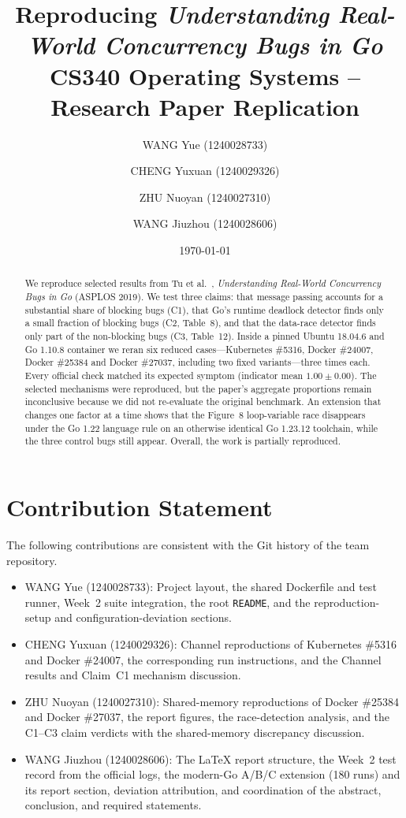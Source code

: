 \documentclass[11pt,a4paper]{article}
\title{Reproducing \emph{Understanding Real-World Concurrency Bugs in Go}\\
\large CS340 Operating Systems -- Research Paper Replication}
\author{
  WANG Yue (1240028733) \and
  CHENG Yuxuan (1240029326) \and
  ZHU Nuoyan (1240027310) \and
  WANG Jiuzhou (1240028606)
}
\date{\today}
\begin{document}
\maketitle

\begin{abstract}
We reproduce selected results from Tu et al.~\cite{tu2019go},
\emph{Understanding Real-World Concurrency Bugs in Go} (ASPLOS 2019).
We test three claims: that message passing accounts for a substantial share
of blocking bugs (C1), that Go's runtime deadlock detector finds only a
small fraction of blocking bugs (C2, Table~8), and that the data-race
detector finds only part of the non-blocking bugs (C3, Table~12).
Inside a pinned Ubuntu 18.04.6 and Go 1.10.8 container we reran six reduced
cases---Kubernetes \#5316, Docker \#24007, Docker \#25384 and Docker \#27037,
including two fixed variants---three times each. Every official check
matched its expected symptom (indicator mean $1.00 \pm 0.00$).
The selected mechanisms were reproduced, but the paper's aggregate
proportions remain inconclusive because we did not re-evaluate the original
benchmark. An extension that changes one factor at a time shows that the
Figure~8 loop-variable race disappears under the Go 1.22 language rule on
an otherwise identical Go 1.23.12 toolchain, while the three control bugs
still appear. Overall, the work is partially reproduced.
\end{abstract}









\section*{Contribution Statement}
The following contributions are consistent with the Git history of the
team repository.
\begin{itemize}
  \item WANG Yue (1240028733): Project layout, the shared Dockerfile and
        test runner, Week~2 suite integration, the root \texttt{README},
        and the reproduction-setup and configuration-deviation sections.
  \item CHENG Yuxuan (1240029326): Channel reproductions of Kubernetes
        \#5316 and Docker \#24007, the corresponding run instructions,
        and the Channel results and Claim~C1 mechanism discussion.
  \item ZHU Nuoyan (1240027310): Shared-memory reproductions of Docker
        \#25384 and Docker \#27037, the report figures, the race-detection
        analysis, and the C1--C3 claim verdicts with the shared-memory
        discrepancy discussion.
  \item WANG Jiuzhou (1240028606): The \LaTeX{} report structure, the
        Week~2 test record from the official logs, the modern-Go A/B/C
        extension (180 runs) and its report section, deviation
        attribution, and coordination of the abstract, conclusion, and
        required statements.
\end{itemize}
\end{document}
